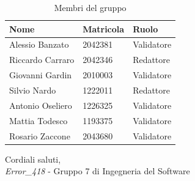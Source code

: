 \documentclass[a4paper, twoside]{article}
\begin{document}
\begin{table}[h]
\centering
\caption*{Membri del gruppo}
\begin{tabular}{lll}
\toprule
Nome & Matricola & Ruolo \\
\midrule
Alessio Banzato & 2042381 & Validatore \\
Riccardo Carraro & 2042346 & Redattore \\
Giovanni Gardin & 2010003 & Validatore \\
Silvio Nardo & 1222011 & Redattore \\
Antonio Oseliero & 1226325 & Validatore \\
Mattia Todesco & 1193375 & Validatore \\
Rosario Zaccone & 2043680 & Validatore \\
\bottomrule
\end{tabular}
\end{table}

\vspace{1cm}
\noindent
Cordiali saluti,\\
\textit{Error\_418} - Gruppo 7 di Ingegneria del Software
\end{document}
